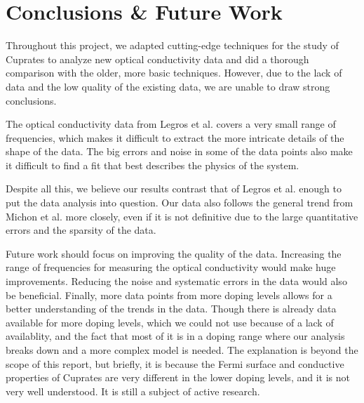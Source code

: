 \section{Conclusions \& Future Work}
Throughout this project, we adapted cutting-edge techniques for the study of Cuprates to analyze
new optical conductivity data and did a thorough comparison with the older, more basic techniques.
However, due to the lack of data and the low quality of the existing data, we are unable to draw
strong conclusions.

The optical conductivity data from Legros et al. covers a very small range of frequencies, which
makes it difficult to extract the more intricate details of the shape of the data. The big errors
and noise in some of the data points also make it difficult to find a fit that best describes the
physics of the system.

Despite all this, we believe our results contrast that of Legros et al. enough to put the data
analysis into question. Our data also follows the general trend from Michon et al. more closely,
even if it is not definitive due to the large quantitative errors and the sparsity of the data.

Future work should focus on improving the quality of the data. Increasing the range of frequencies
for measuring the optical conductivity would make huge improvements. Reducing the noise and
systematic errors in the data would also be beneficial. Finally, more data points from more
doping levels allows for a better understanding of the trends in the data. Though there is already
data available for more doping levels, which we could not use because of a lack of availablity, and
the fact that most of it is in a doping range where our analysis breaks down and a more complex
model is needed. The explanation is beyond the scope of this report, but briefly, it is because the
Fermi surface and conductive properties of Cuprates are very different in the lower doping levels,
and it is not very well understood. It is still a subject of active research.